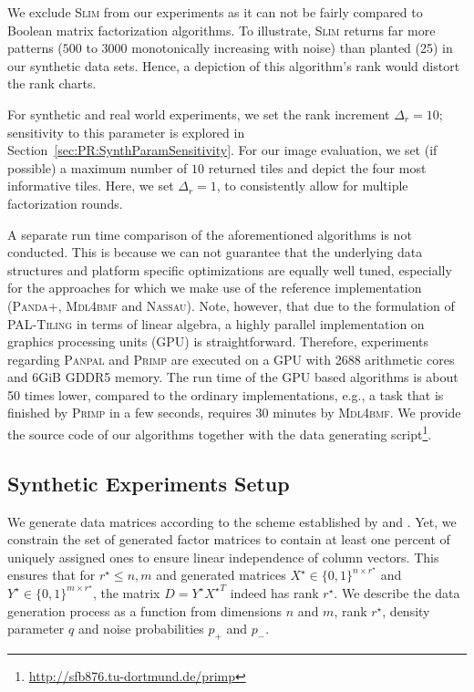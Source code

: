 We exclude \textsc{Slim} from our experiments as it can not be fairly compared to Boolean matrix factorization algorithms. To illustrate, \textsc{Slim} returns far more patterns ($500$ to $3000$ monotonically increasing with noise) than planted (25) in our synthetic data sets. Hence, a depiction of this algorithm's rank would distort the rank charts.

For synthetic and real world experiments, we set the rank increment $\Delta_r=10$; sensitivity to this parameter is explored in Section~\ref{sec:PR:SynthParamSensitivity}. For our image evaluation, we set (if possible) a maximum number of $10$ returned tiles and depict the four most informative tiles. Here, we set $\Delta_r=1$, to consistently allow for multiple factorization rounds. 

A separate run time comparison of the aforementioned algorithms is not conducted. This is because we can not guarantee that the underlying data structures and platform specific optimizations are equally well tuned, especially for the approaches for which we make use of the reference implementation (\textsc{Panda+}, \textsc{Mdl4bmf} and \textsc{Nassau}). Note, however, that due to the formulation of \textsc{PAL-Tiling} in terms of linear algebra, a highly parallel implementation on graphics processing units (GPU) is straightforward. Therefore, experiments regarding \textsc{Panpal} and \textsc{Primp} are executed on a GPU with 2688 arithmetic cores and 6GiB GDDR5 memory. The run time of the GPU based algorithms is about 50 times lower, compared to the ordinary implementations, e.g., a task that is finished by \textsc{Primp} in a few seconds, requires 30 minutes by \textsc{Mdl4bmf}. We provide the source code of our algorithms together with the data generating script\footnote{\url{http://sfb876.tu-dortmund.de/primp}}.
\subsection{Synthetic Experiments Setup} 
We generate data matrices according to the scheme established by \cite{miettinen2014mdl4bmf,karaev2015getting} and \cite{lucchese2014unifying}. Yet, we constrain the set of generated factor matrices to contain at least one percent of uniquely assigned ones to ensure linear independence of column vectors. This ensures that for $r^\star\leq n,m$ and generated matrices $X^\star\in\{0,1\}^{n\times r^\star}$ and $Y^\star\in\{0,1\}^{m\times r^\star}$, the matrix $D=Y^\star {X^\star}^T$ indeed has rank $r^\star$. We describe the data generation process as a function from dimensions $n$ and $m$, rank $r^\star$, density parameter $q$ and noise probabilities $p_+$ and $p_-$. 

